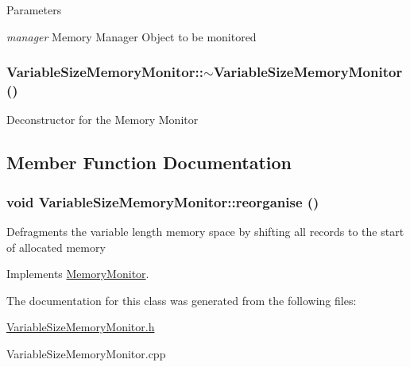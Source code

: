 \begin{DoxyParams}{Parameters}
\item[{\em manager}]Memory Manager Object to be monitored \end{DoxyParams}
\hypertarget{classVariableSizeMemoryMonitor_a5495eb465a7ba0d742ec7f36a276cb4c}{
\subsubsection[{$\sim$VariableSizeMemoryMonitor}]{\setlength{\rightskip}{0pt plus 5cm}VariableSizeMemoryMonitor::$\sim$VariableSizeMemoryMonitor ()}}
\label{classVariableSizeMemoryMonitor_a5495eb465a7ba0d742ec7f36a276cb4c}
Deconstructor for the Memory Monitor 

\subsection{Member Function Documentation}
\hypertarget{classVariableSizeMemoryMonitor_aac18cf1e82190d4b9bdb1d09729b7cd6}{
\subsubsection[{reorganise}]{\setlength{\rightskip}{0pt plus 5cm}void VariableSizeMemoryMonitor::reorganise ()}}
\label{classVariableSizeMemoryMonitor_aac18cf1e82190d4b9bdb1d09729b7cd6}
Defragments the variable length memory space by shifting all records to the start of allocated memory 

Implements \hyperlink{classMemoryMonitor}{MemoryMonitor}.



The documentation for this class was generated from the following files:\begin{DoxyCompactItemize}
\item 
\hyperlink{VariableSizeMemoryMonitor_8h}{VariableSizeMemoryMonitor.h}\item 
VariableSizeMemoryMonitor.cpp\end{DoxyCompactItemize}
